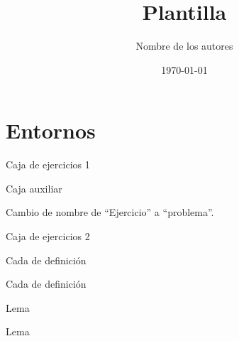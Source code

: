 \documentclass[11pt]{article}
\title{Plantilla}
\author{Nombre de los autores}
\date{\today}
\begin{document}
\maketitle


\section{Entornos}


\begin{exercise}
  Caja de ejercicios 1
\end{exercise}

\begin{exercise*}
  Caja auxiliar
\end{exercise*}

Cambio de nombre de ``Ejercicio'' a ``problema''.

\begin{exercise}
  Caja de ejercicios 2
\end{exercise}

\begin{definition}
  Cada de definición
\end{definition}

\begin{definition*}
  Cada de definición
\end{definition*}

\begin{lemma}
  Lema
\end{lemma}

\begin{lemma*}
  Lema
\end{lemma*}
\end{document}
